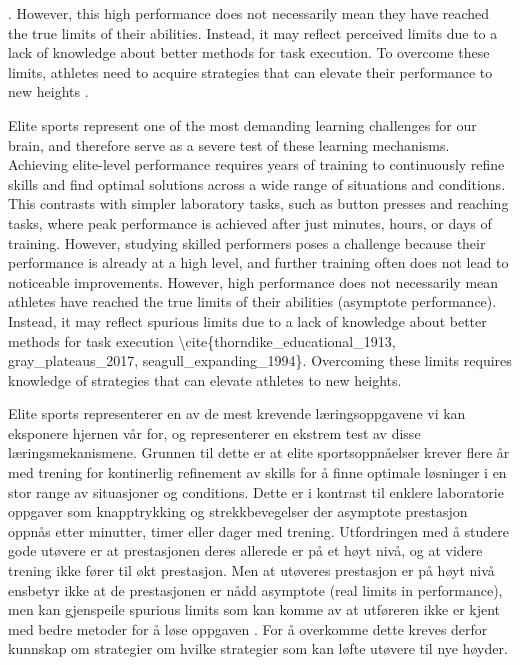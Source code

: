. However, this high performance does not necessarily mean they have reached the true limits of their abilities. Instead, it may reflect perceived limits due to a lack of knowledge about better methods for task execution. To overcome these limits, athletes need to acquire strategies that can elevate their performance to new heights . 








Elite sports represent one of the most demanding learning challenges for our brain, and therefore serve as a severe test of these learning mechanisms. Achieving elite-level performance requires years of training to continuously refine skills and find optimal solutions across a wide range of situations and conditions. This contrasts with simpler laboratory tasks, such as button presses and reaching tasks, where peak performance is achieved after just minutes, hours, or days of training. However, studying skilled performers poses a challenge because their performance is already at a high level, and further training often does not lead to noticeable improvements. However, high performance does not necessarily mean athletes have reached the true limits of their abilities (asymptote performance). Instead, it may reflect spurious limits due to a lack of knowledge about better methods for task execution \textbackslash{}cite\{thorndike\_educational\_1913, gray\_plateaus\_2017, seagull\_expanding\_1994\}. Overcoming these limits requires knowledge of strategies that can elevate athletes to new heights.

 













Elite sports representerer en av de mest krevende læringsoppgavene vi kan eksponere hjernen vår for, og representerer en ekstrem test av disse læringsmekanismene. Grunnen til dette er at elite sportsoppnåelser krever flere år med trening for kontinerlig refinement av skills for å finne optimale løsninger i en stor range av situasjoner og conditions. Dette er i kontrast til enklere laboratorie oppgaver som knapptrykking og strekkbevegelser der asymptote prestasjon oppnås etter minutter, timer eller dager med trening. Utfordringen med å studere gode utøvere er at prestasjonen deres allerede er på et høyt nivå, og at videre trening ikke fører til økt prestasjon. Men at utøveres prestasjon er på høyt nivå ensbetyr ikke at de prestasjonen er nådd asymptote (real limits in performance), men kan gjenspeile spurious limits som kan komme av at utføreren ikke er kjent med bedre metoder for å løse oppgaven \cite{thorndike_educational_1913, gray_plateaus_2017, seagull_expanding_1994} . For å overkomme dette kreves derfor kunnskap om strategier om hvilke strategier som kan løfte utøvere til nye høyder. 


